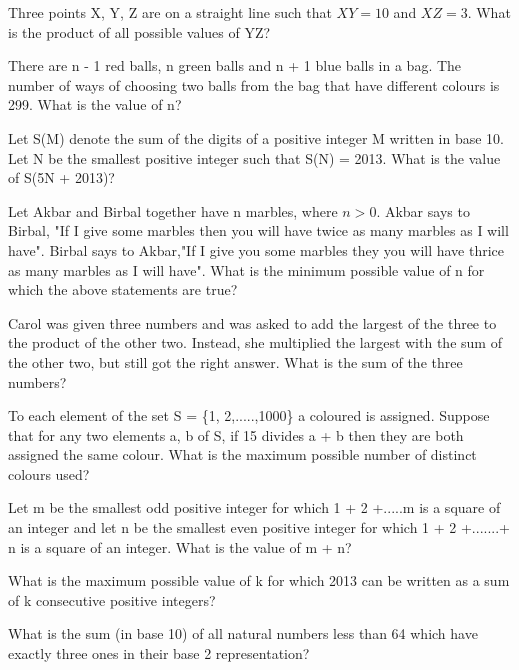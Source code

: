 \item Three points X, Y, Z are on a straight line such that $XY = 10$ and $XZ = 3$. What is the product of all possible values of YZ?

\item There are n - 1 red balls, n green balls and n + 1 blue balls in a bag. The number of ways of choosing two balls from the bag that have different colours is 299. What is the value of n?

\item Let S(M) denote the sum of the digits of a positive integer M written in base 10. Let N be the smallest positive integer such that S(N) = 2013. What is the value of S(5N + 2013)?

\item Let Akbar and Birbal together have n marbles, where $n > 0$. Akbar says to Birbal, "If I give some marbles then you will have twice as many marbles as I will have". Birbal says to Akbar,"If I give you some marbles they you will have thrice as many marbles as I will have". What is the minimum possible value of n for which the above statements are true?

\item Carol was given three numbers and was asked to add the largest of the three to the product of the other two. Instead, she multiplied the largest with the sum of the other two, but still got the right answer. What is the sum of the three numbers?
\item To each element of the set S = \{1, 2,.....,1000\}  a coloured is assigned. Suppose that for any two elements a, b of S, if 15 divides a + b then they are both assigned the same colour. What is the maximum possible number of distinct colours used?

\item Let m be the smallest odd positive integer for which 1 + 2 +.....m is a square of an integer and let n be the smallest even positive integer for which 1 + 2 +.......+ n is a square of an integer. What is the value of m + n?

\item What is the maximum possible value of k for which 2013 can be written as a sum of k consecutive positive integers?

\item What is the sum (in base 10) of all natural numbers less than 64 which have exactly three ones in their base 2 representation?

